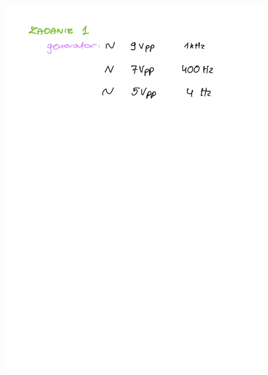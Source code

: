 \documentclass[14pt, table]{extarticle}
\begin{document}
\begin{figure}[H]
\includegraphics[scale=0.2]{B3}
\centering
\captionsetup{labelformat=empty}
\caption{}
\end{figure}
\end{document}
